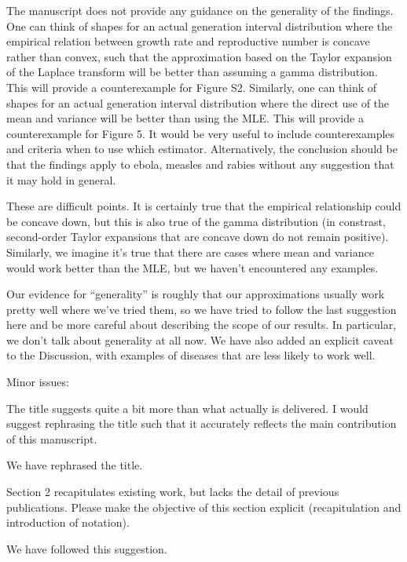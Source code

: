 \documentclass[12pt]{article}
\newcommand{\revtext}{\textsf}
\begin{document}
\revtext{The manuscript does not provide any guidance on the generality of the findings. One can think of shapes for an actual generation interval distribution where the empirical relation between growth rate and reproductive number is concave rather than convex, such that the approximation based on the Taylor expansion of the Laplace transform will be better than assuming a gamma distribution. This will provide a counterexample for Figure S2. Similarly, one can think of shapes for an actual generation interval distribution where the direct use of the mean and variance will be better than using the MLE. This will provide a counterexample for Figure 5. It would be very useful to include counterexamples and criteria when to use which estimator. Alternatively, the conclusion should be that the findings apply to ebola, measles and rabies without any suggestion that it may hold in general.}

These are difficult points. It is certainly true that the empirical relationship could be concave down, but this is also true of the gamma distribution (in constrast, second-order Taylor expansions that are concave down do not remain positive). Similarly, we imagine it's true that there are cases where mean and variance would work better than the MLE, but we haven't encountered any examples.

Our evidence for ``generality'' is roughly that our approximations usually work pretty well where we've tried them, so we have tried to follow the last suggestion here and be more careful about describing the scope of our results. In particular, we don't talk about generality at all now. We have also added an explicit caveat to the Discussion, with examples of diseases that are less likely to work well.

\revtext{Minor issues:}

\revtext{The title suggests quite a bit more than what actually is delivered. I would suggest rephrasing the title such that it accurately reflects the main contribution of this manuscript.}

We have rephrased the title.

\revtext{Section 2 recapitulates existing work, but lacks the detail of previous publications. Please make the objective of this section explicit (recapitulation and introduction of notation).}

We have followed this suggestion.
\end{document}
